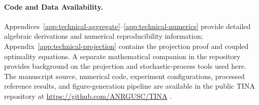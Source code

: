 \documentclass[11pt]{article}
\begin{document}
\paragraph{Code and Data Availability.}
Appendices~\ref{app:technical-aggregate}--\ref{app:technical-numerics} provide detailed algebraic
derivations and numerical reproducibility information;
Appendix~\ref{app:technical-projection} contains the projection proof and
coupled optimality equations. A separate mathematical
companion in the repository provides background on the projection and
stochastic-process tools used here.
The manuscript source, numerical code, experiment configurations, processed
reference results, and figure-generation pipeline are available in the public
TINA repository at \url{https://github.com/ANRGUSC/TINA}
\cite{tina2026software}.




\clearpage
\appendix
{}

\end{document}
